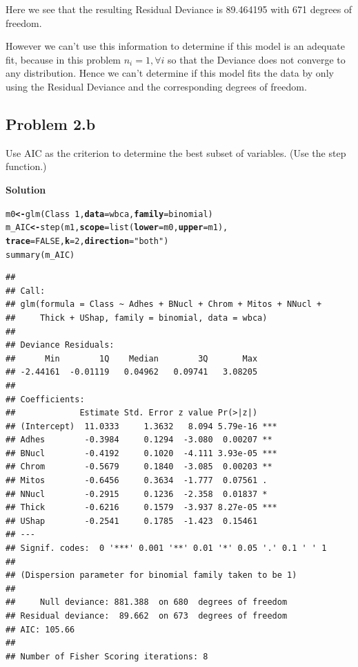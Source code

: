 \documentclass[12pt,oneside,a4paper]{article}\usepackage[]{graphicx}\usepackage[]{xcolor}
\makeatletter
\newcommand{\hlnum}[1]{\textcolor[rgb]{0,0,0}{#1}}%
\newcommand{\hlstr}[1]{\textcolor[rgb]{0,0,1}{#1}}%
\newcommand{\hlopt}[1]{\textcolor[rgb]{0,0,0}{#1}}%
\newcommand{\hlstd}[1]{\textcolor[rgb]{0,0,0}{#1}}%
\newcommand{\hlkwb}[1]{\textcolor[rgb]{0.498,0,0.333}{\textbf{#1}}}%
\newcommand{\hlkwc}[1]{\textcolor[rgb]{0.498,0,0.333}{\textbf{#1}}}%
\newcommand{\hlkwd}[1]{\textcolor[rgb]{0,0,0}{#1}}%
\newenvironment{kframe}{%
 \def\at@end@of@kframe{}%
 \ifinner\ifhmode%
  \def\at@end@of@kframe{\end{minipage}}%
  \begin{minipage}{\columnwidth}%
 \fi\fi%
 \def\FrameCommand##1{\hskip\@totalleftmargin \hskip-\fboxsep
 \colorbox{shadecolor}{##1}\hskip-\fboxsep
     \hskip-\linewidth \hskip-\@totalleftmargin \hskip\columnwidth}%
 \MakeFramed {\advance\hsize-\width
   \@totalleftmargin\z@ \linewidth\hsize
   \@setminipage}}%
 {\par\unskip\endMakeFramed%
 \at@end@of@kframe}
\newenvironment{knitrout}{}{} %
\newcommand{\subproblem}[1]
{
    \subsection*{Problem {#1}}
}
\newcommand{\solution}
{
    \vspace{15pt}
    \noindent\ignorespaces\textbf{\large Solution}\par
}
\makeatother
\begin{document}
Here we see that the resulting Residual Deviance is 89.464195 with 671 degrees of freedom. 

However we can't use this information to determine if this model is an adequate fit, because in this problem $n_{i} = 1, \forall i$ so that the Deviance does not converge to any distribution. Hence we can't determine if this model fits the data by only using the Residual Deviance and the corresponding degrees of freedom.

\subproblem{2.b}
Use AIC as the criterion to determine the best subset of variables. (Use the step function.)

\solution
\begin{knitrout}
\color{fgcolor}\begin{kframe}
\begin{alltt}
\hlstd{m0} \hlkwb{<-} \hlkwd{glm}\hlstd{(Class} \hlopt{~} \hlnum{1}\hlstd{,} \hlkwc{data} \hlstd{= wbca,} \hlkwc{family} \hlstd{= binomial)}
\hlstd{m_AIC} \hlkwb{<-} \hlkwd{step}\hlstd{(m1,} \hlkwc{scope} \hlstd{=} \hlkwd{list}\hlstd{(}\hlkwc{lower} \hlstd{= m0,} \hlkwc{upper} \hlstd{= m1),}
     \hlkwc{trace} \hlstd{=} \hlnum{FALSE}\hlstd{,} \hlkwc{k} \hlstd{=} \hlnum{2}\hlstd{,} \hlkwc{direction} \hlstd{=} \hlstr{"both"}\hlstd{)}
\hlkwd{summary}\hlstd{(m_AIC)}
\end{alltt}
\begin{verbatim}
## 
## Call:
## glm(formula = Class ~ Adhes + BNucl + Chrom + Mitos + NNucl + 
##     Thick + UShap, family = binomial, data = wbca)
## 
## Deviance Residuals: 
##      Min        1Q    Median        3Q       Max  
## -2.44161  -0.01119   0.04962   0.09741   3.08205  
## 
## Coefficients:
##             Estimate Std. Error z value Pr(>|z|)    
## (Intercept)  11.0333     1.3632   8.094 5.79e-16 ***
## Adhes        -0.3984     0.1294  -3.080  0.00207 ** 
## BNucl        -0.4192     0.1020  -4.111 3.93e-05 ***
## Chrom        -0.5679     0.1840  -3.085  0.00203 ** 
## Mitos        -0.6456     0.3634  -1.777  0.07561 .  
## NNucl        -0.2915     0.1236  -2.358  0.01837 *  
## Thick        -0.6216     0.1579  -3.937 8.27e-05 ***
## UShap        -0.2541     0.1785  -1.423  0.15461    
## ---
## Signif. codes:  0 '***' 0.001 '**' 0.01 '*' 0.05 '.' 0.1 ' ' 1
## 
## (Dispersion parameter for binomial family taken to be 1)
## 
##     Null deviance: 881.388  on 680  degrees of freedom
## Residual deviance:  89.662  on 673  degrees of freedom
## AIC: 105.66
## 
## Number of Fisher Scoring iterations: 8
\end{verbatim}
\end{kframe}
\end{knitrout}
\end{document}
